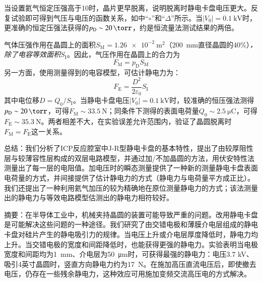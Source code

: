 当设置氦气恒定压强高于\SI{10}{\torr}时，晶片更早脱离，说明脱离时静电卡盘电压更大。反复试验即可得到气压与电压的函数关系，如中``$\circ$''和``$\Delta$''所示。当$\left|V_0\right|=\SI{0.1}{\kV}$时，更准确的恒定压强法获得的$p_{\mathrm{D}} \sim \SI{20}{\torr}$，约是恒流量法测试结果的两倍。

气体压强作用在晶圆上的面积$S_{\mathrm{M}}=\SI{1.26e-2}{\m^2}$（\SI{200}{\mm}直径晶圆的40\%）\textit{，除了电容等效面积$S_{\mathrm{I}}$}\footnotemark{}。因此，气压作用在晶圆上的合力为
\begin{equation}\tag*{(A-2)}\label{eq:-a-2}
F_{\mathrm{M}} = p_{\mathrm{D}} S_{\mathrm{M}}
\end{equation}
另一方面，使用测量得到的电容模型，可估计静电力为：
\begin{equation}\tag*{(A-3)}\label{eq:-a-3}
F_{\mathrm{E}} = \frac{D^2}{2 \varepsilon_0} S_{\mathrm{I}}
\end{equation}
其中电位移$D=Q_0/S_{\mathrm{I}}$。当静电卡盘电压$\left|V_0\right|=\SI{0.1}{\kV}$时，较准确的恒压强法测得$p_{\mathrm{D}} \sim \SI{20}{\torr}$，可得$F_{\mathrm{M}} \sim \SI{33.5}{\N}$；同条件下测得的表面电荷量$Q_0 \sim \SI{2.5}{\micro\coulomb}$，可得$F_{\mathrm{E}} \sim \SI{35.3}{\N}$。两者相差不大，在实验误差允许范围内，验证了晶圆脱离时$F_{\mathrm{M}}=F_{\mathrm{E}}$这一关系。


总结：我们分析了ICP反应腔室中J-R型静电卡盘的基本特性，提出了由较厚阻性层与较薄容性层构成的双层电路模型，并通过加/不加晶圆的方法，用伏安特性法测量出了每一层的电阻值。加电压时的瞬态测量提供了一种新的测量静电卡盘表面电荷量的方式，并间接提供了估计静电力的方式（静电力与电荷量平方成正比）。我们还提出了一种利用氦气加压的较为精确地在原位测量静电力的方式；该法测量出的静电力与等效电路模型估测出的静电力相符较好。



\clearpage



\noindent 摘要：在半导体工业中，机械夹持晶圆的装置可能导致严重的问题。改用静电卡盘是可能解决这些问题的一种途径。我们研究了由交错电极和薄膜介电层组成的静电卡盘对硅片产生的静电吸引力的规律。当电压上升或介电层厚度降低时，静电力均上升。当交错电极的宽度和间距降低时，也能获得更强的静电力。实验表明当电极宽度和间距均为\SI{1}{\mm}、介电层为\SI{50}{\um}时，可获得最强的静电力：电压3.7 kV、吸引4英寸晶圆时，竖直方向静电力约为\SI{17}{\N}。在施加高压直流电压后，即使撤去电压，仍存在一些残余静电力，这种效应可用施加变频交流高压电的方式解决。

